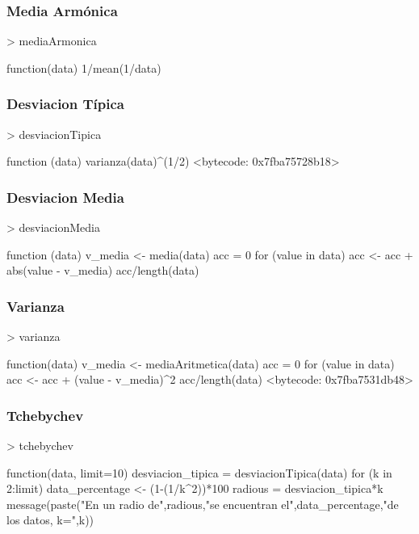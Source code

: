 \documentclass [a4paper] {article}
\begin{document}
\begin{center}
\subsubsection{Media Armónica}
\begin{Schunk}
\begin{Sinput}
> mediaArmonica
\end{Sinput}
\begin{Soutput}
function(data){
  1/mean(1/data)
}
\end{Soutput}
\end{Schunk}
\subsubsection{Desviacion Típica}
\begin{Schunk}
\begin{Sinput}
> desviacionTipica
\end{Sinput}
\begin{Soutput}
function (data) {
  varianza(data)^(1/2)
}
<bytecode: 0x7fba75728b18>
\end{Soutput}
\end{Schunk}
\subsubsection{Desviacion Media}
\begin{Schunk}
\begin{Sinput}
> desviacionMedia
\end{Sinput}
\begin{Soutput}
function (data){
  v_media <- media(data)
  acc = 0
  for (value in data){
    acc <- acc + abs(value - v_media)
  }
  acc/length(data)
}
\end{Soutput}
\end{Schunk}
\subsubsection{Varianza}
\begin{Schunk}
\begin{Sinput}
> varianza
\end{Sinput}
\begin{Soutput}
function(data){
  v_media <- mediaAritmetica(data)
  acc = 0
  for (value in data){
    acc <- acc + (value - v_media)^2
  }
  acc/length(data)
}
<bytecode: 0x7fba7531db48>
\end{Soutput}
\end{Schunk}
\subsubsection{Tchebychev}
\begin{Schunk}
\begin{Sinput}
> tchebychev
\end{Sinput}
\begin{Soutput}
function(data, limit=10){
  desviacion_tipica = desviacionTipica(data)
  for (k in 2:limit){
    data_percentage <- (1-(1/k^2))*100
    radious = desviacion_tipica*k
    message(paste("En un radio de",radious,"se encuentran el",data_percentage,"de los datos, k=",k))
  }
}
\end{Soutput}
\end{Schunk}

\end{center}
\end{document}

